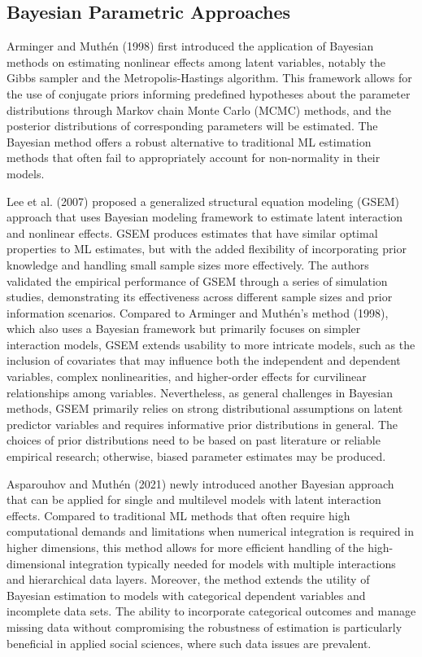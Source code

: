 \documentclass[
  11pt,
  man]{apa6}
\begin{document}
\hypertarget{bayesian-parametric-approaches}{%
\subsection{Bayesian Parametric Approaches}\label{bayesian-parametric-approaches}}

Arminger and Muthén (1998) first introduced the application of Bayesian methods on estimating nonlinear effects among latent variables, notably the Gibbs sampler and the Metropolis-Hastings algorithm. This framework allows for the use of conjugate priors informing predefined hypotheses about the parameter distributions through Markov chain Monte Carlo (MCMC) methods, and the posterior distributions of corresponding parameters will be estimated. The Bayesian method offers a robust alternative to traditional ML estimation methods that often fail to appropriately account for non-normality in their models.

Lee et al. (2007) proposed a generalized structural equation modeling (GSEM) approach that uses Bayesian modeling framework to estimate latent interaction and nonlinear effects. GSEM produces estimates that have similar optimal properties to ML estimates, but with the added flexibility of incorporating prior knowledge and handling small sample sizes more effectively. The authors validated the empirical performance of GSEM through a series of simulation studies, demonstrating its effectiveness across different sample sizes and prior information scenarios. Compared to Arminger and Muthén's method (1998), which also uses a Bayesian framework but primarily focuses on simpler interaction models, GSEM extends usability to more intricate models, such as the inclusion of covariates that may influence both the independent and dependent variables, complex nonlinearities, and higher-order effects for curvilinear relationships among variables. Nevertheless, as general challenges in Bayesian methods, GSEM primarily relies on strong distributional assumptions on latent predictor variables and requires informative prior distributions in general. The choices of prior distributions need to be based on past literature or reliable empirical research; otherwise, biased parameter estimates may be produced.

Asparouhov and Muthén (2021) newly introduced another Bayesian approach that can be applied for single and multilevel models with latent interaction effects. Compared to traditional ML methods that often require high computational demands and limitations when numerical integration is required in higher dimensions, this method allows for more efficient handling of the high-dimensional integration typically needed for models with multiple interactions and hierarchical data layers. Moreover, the method extends the utility of Bayesian estimation to models with categorical dependent variables and incomplete data sets. The ability to incorporate categorical outcomes and manage missing data without compromising the robustness of estimation is particularly beneficial in applied social sciences, where such data issues are prevalent.
\end{document}
